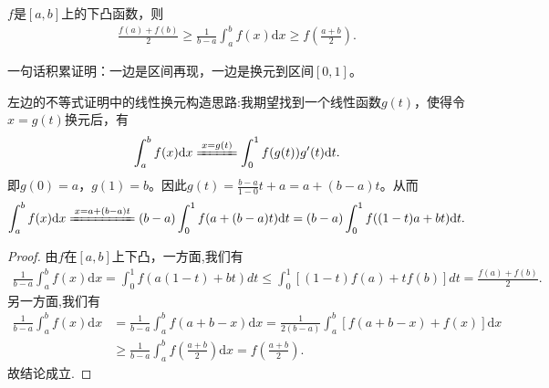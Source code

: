\documentclass[../../main.tex]{subfiles}
\begin{document}
\begin{theorem}[Hadamard不等式]\label{theorem:Hadamard不等式}
\(f\)是\([a,b]\)上的下凸函数，则
\begin{align*}
\frac{f(a)+f(b)}{2} \geqslant \frac{1}{b - a}\int_{a}^{b}f(x)\mathrm{d}x \geqslant f\left(\frac{a + b}{2}\right).
\end{align*} 
\end{theorem}
\begin{note}
一句话积累证明：一边是区间再现，一边是换元到区间\([0,1]\)。
\end{note}
\begin{remark}
左边的不等式证明中的线性换元构造思路:我期望找到一个线性函数$g(t)$，使得令$x = g(t)$换元后，有
\begin{align*}
\int_a^b f(x) \mathrm{d}x \xlongequal{x = g(t)} \int_0^1 f(g(t))g'(t) \mathrm{d}t.
\end{align*}
即$g(0) = a$，$g(1) = b$。因此$g(t) = \frac{b - a}{1 - 0}t + a = a + (b - a)t$。从而
\begin{align*}
\int_a^b f(x) \mathrm{d}x \xlongequal{x = a + (b - a)t} (b - a)\int_0^1 f(a + (b - a)t) \mathrm{d}t = (b - a)\int_0^1 f((1 - t)a + bt) \mathrm{d}t.
\end{align*} 
\end{remark}
\begin{proof}
由$f$在$[a,b]$上下凸，一方面,我们有
\begin{align*}
\frac{1}{b - a}\int_{a}^{b}f(x)\mathrm{d}x = \int_{0}^{1}f(a(1 - t)+bt)dt \leqslant \int_{0}^{1}[(1 - t)f(a)+tf(b)]dt = \frac{f(a)+f(b)}{2}.
\end{align*}
另一方面,我们有
\begin{align*}
\frac{1}{b - a}\int_{a}^{b}f(x)\mathrm{d}x &= \frac{1}{b - a}\int_{a}^{b}f(a + b - x)\mathrm{d}x
= \frac{1}{2(b - a)}\int_{a}^{b}[f(a + b - x)+f(x)]\mathrm{d}x\\
&\geqslant \frac{1}{b - a}\int_{a}^{b}f\left(\frac{a + b}{2}\right)\mathrm{d}x
= f\left(\frac{a + b}{2}\right).
\end{align*}
故结论成立.
\end{proof}
\end{document}
